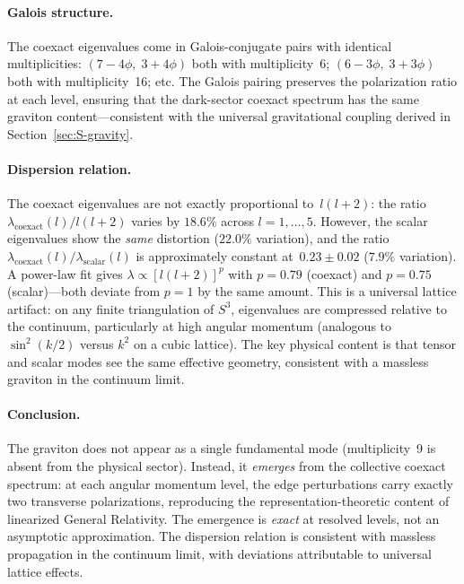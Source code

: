 \documentclass[12pt,a4paper]{article}
\theoremstyle{definition}
\begin{document}
\paragraph{Galois structure.}
The coexact eigenvalues come in Galois-conjugate pairs with identical multiplicities: $(7-4\phi,\; 3+4\phi)$ both with multiplicity~6; $(6-3\phi,\; 3+3\phi)$ both with multiplicity~16; etc.  The Galois pairing preserves the polarization ratio at each level, ensuring that the dark-sector coexact spectrum has the same graviton content---consistent with the universal gravitational coupling derived in Section~\ref{sec:S-gravity}.

\paragraph{Dispersion relation.}
The coexact eigenvalues are not exactly proportional to~$l(l+2)$: the ratio $\lambda_{\mathrm{coexact}}(l)/l(l+2)$ varies by $18.6\%$ across $l = 1, \ldots, 5$.  However, the scalar eigenvalues show the \emph{same} distortion ($22.0\%$ variation), and the ratio $\lambda_{\mathrm{coexact}}(l)/\lambda_{\mathrm{scalar}}(l)$ is approximately constant at~$0.23 \pm 0.02$ ($7.9\%$ variation).  A power-law fit gives $\lambda \propto [l(l+2)]^p$ with $p = 0.79$ (coexact) and $p = 0.75$ (scalar)---both deviate from $p = 1$ by the same amount.  This is a universal lattice artifact: on any finite triangulation of $S^3$, eigenvalues are compressed relative to the continuum, particularly at high angular momentum (analogous to $\sin^2(k/2)$ versus $k^2$ on a cubic lattice).  The key physical content is that tensor and scalar modes see the same effective geometry, consistent with a massless graviton in the continuum limit.

\paragraph{Conclusion.}
The graviton does not appear as a single fundamental mode (multiplicity~9 is absent from the physical sector).  Instead, it \emph{emerges} from the collective coexact spectrum: at each angular momentum level, the edge perturbations carry exactly two transverse polarizations, reproducing the representation-theoretic content of linearized General Relativity.  The emergence is \emph{exact} at resolved levels, not an asymptotic approximation.  The dispersion relation is consistent with massless propagation in the continuum limit, with deviations attributable to universal lattice effects.
\end{document}
